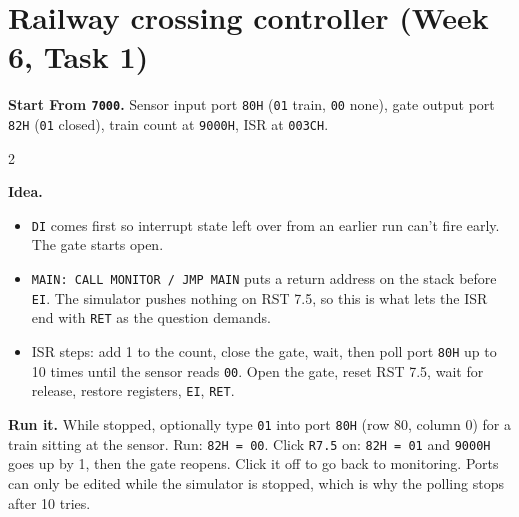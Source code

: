 \documentclass[11pt,a4paper]{article}
\newcommand{\code}[1]{\texttt{#1}}
\newcommand{\prog}[2]{\needspace{12\baselineskip}\section{#1}\label{#2}}
\newcommand{\meta}[2]{\textbf{Start From \code{#1}.} #2\par}
\begin{document}
\newpage
\prog{Railway crossing controller (Week 6, Task 1)}{p14}
\meta{7000}{Sensor input port \code{80H} (\code{01} train, \code{00} none), gate output port \code{82H} (\code{01} closed), train count at \code{9000H}, ISR at \code{003CH}.}
\begin{multicols}{2}

\end{multicols}
\textbf{Idea.}
\begin{itemize}[leftmargin=*]
\item \code{DI} comes first so interrupt state left over from an earlier run can't fire early. The gate starts open.
\item \code{MAIN: CALL MONITOR / JMP MAIN} puts a return address on the stack before \code{EI}. The simulator pushes nothing on RST 7.5, so this is what lets the ISR end with \code{RET} as the question demands.
\item ISR steps: add 1 to the count, close the gate, wait, then poll port \code{80H} up to 10 times until the sensor reads \code{00}. Open the gate, reset RST 7.5, wait for release, restore registers, \code{EI}, \code{RET}.
\end{itemize}
\textbf{Run it.} While stopped, optionally type \code{01} into port \code{80H} (row 80, column 0) for a train sitting at the sensor. Run: \code{82H = 00}. Click \code{R7.5} on: \code{82H = 01} and \code{9000H} goes up by 1, then the gate reopens. Click it off to go back to monitoring. Ports can only be edited while the simulator is stopped, which is why the polling stops after 10 tries.
\end{document}
